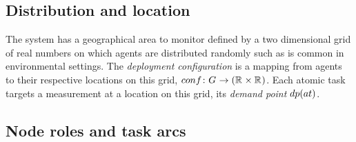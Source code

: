 \subsection{Distribution and location}
The system has a geographical area to monitor defined by a two dimensional grid of real numbers on which agents are distributed randomly such as is common in environmental settings. The \textit{deployment configuration} is a mapping from agents to their respective locations on this grid, $\formalDeployment{}{}$. Each atomic task targets a measurement at a location on this grid, its \textit{demand point} $\functionTaskDemandPoint{}{}$.

\subsection{Node roles and task arcs}
\newcommand{\formalSinkRole}[2]{
	\functionFormal{sink}
	{\setAtomicTask{}{}}
	{\setAgents{}{}}
}
\newcommand{\formalSenseRole}[2]{
	\functionFormal{sense}
	{\setAtomicTask{}{}}
	{\setAgents{}{}}
}
\newcommand{\formalActiveRole}[2]{
	\functionFormal{active}
	{\setAtomicTask{}{}}
	{\powerSetAgents{}{}}
}
\newcommand{\formalIdleRole}[2]{
	\functionFormal{idle_{\setTime{}{}}}
	{\setAtomicTask{}{}}
	{\powerSetAgents{}{}}
}
\newcommand{\formalSleepRole}[2]{
	\functionFormal{sink_{\setTime{}{}}}
	{\setAtomicTask{}{}}
	{\powerSetAgents{}{}}
}
\newcommand{\functionSinkRole}[2]{\functionSignature{sink}{\varAtomicTask{}{}}}
	
\newcommand{\functionSenseRole}[2]{\functionSignature{sense}{\varAtomicTask{}{}}}
\newcommand{\functionActiveRole}[2]{\functionSignature{active_{#1}}{\varAtomicTask{}{}}}
\newcommand{\functionIdleRole}[2]{\functionSignature{idle}{\varAtomicTask{}{}}}
\newcommand{\functionSleepRole}[2]{\functionSignature{sleep}{\varAtomicTask{}{}}}

